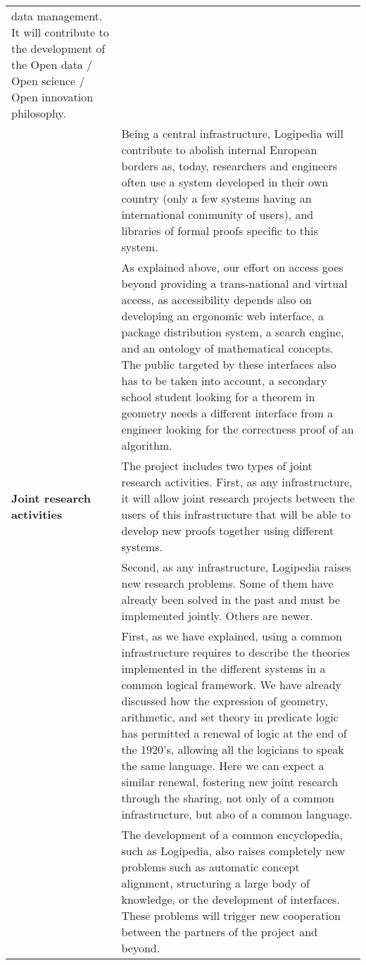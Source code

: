 \begin{longtable}{|p{}|p{}|}
data management. It will contribute to the development of the Open
data / Open science / Open innovation philosophy.\\
&
\hspace{0.4cm}
Being a central infrastructure, Logipedia will contribute to abolish
internal European borders as, today, researchers and engineers often
use a system developed in their own country (only a few systems having
an international community of users), and libraries of formal proofs
specific to this system.\\
&
\hspace{0.4cm}
As explained above, our effort on access goes beyond providing a
trans-national and virtual access, as accessibility depends also on
developing an ergonomic web interface, a package distribution system,
a search engine, and an ontology of mathematical concepts. The public
targeted by these interfaces also has to be taken into account, a
secondary school student looking for a theorem in geometry needs a
different interface from a engineer looking for the correctness proof
of an algorithm.\\
\hline
{\bf Joint research activities}
&
The project includes two types of joint research activities.  First,
as any infrastructure, it will allow joint research projects between
the users of this infrastructure that will be able to develop new
proofs together using different systems.\\
&
\hspace{0.4cm}
Second, as any infrastructure, Logipedia raises new research
problems. Some of them have already been solved in the past and
must be implemented jointly. Others are newer.\\
&
\hspace{0.4cm}
First, as we have explained, using a common infrastructure requires
to describe the theories implemented in the different systems in a
common logical framework. We have already discussed how the expression
of geometry, arithmetic, and set theory in predicate logic has
permitted a renewal of logic at the end of the 1920's, allowing all
the logicians to speak the same language. Here we can expect a similar
renewal, fostering new joint research through the sharing, not
only of a common infrastructure, but also of a common language.\\
&
\hspace{0.4cm}
The development of a common encyclopedia, such as Logipedia, also
raises completely new problems such as automatic concept alignment,
structuring a large body of knowledge, or the development of
interfaces. These problems will trigger new cooperation between the
partners of the project and beyond.\\
\hline
\end{longtable}

